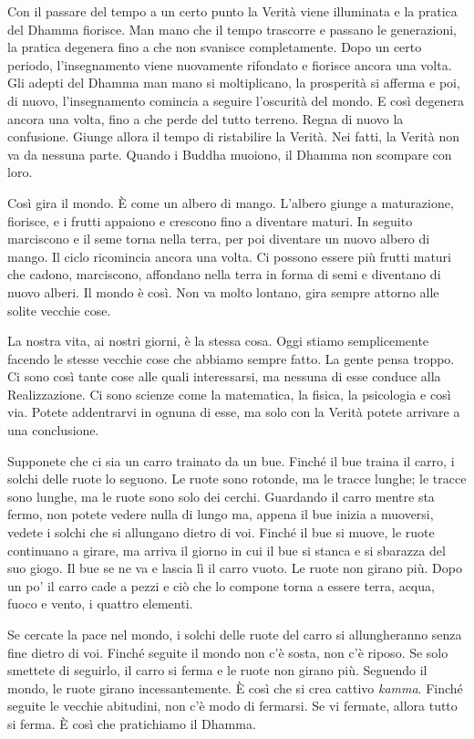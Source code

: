 Con il passare del tempo a un certo punto la Verità viene illuminata e
la pratica del Dhamma fiorisce. Man mano che il tempo trascorre e
passano le generazioni, la pratica degenera fino a che non svanisce
completamente. Dopo un certo periodo, l'insegnamento viene nuovamente
rifondato e fiorisce ancora una volta. Gli adepti del Dhamma man mano si
moltiplicano, la prosperità si afferma e poi, di nuovo, l'insegnamento
comincia a seguire l'oscurità del mondo. E così degenera ancora una
volta, fino a che perde del tutto terreno. Regna di nuovo la confusione.
Giunge allora il tempo di ristabilire la Verità. Nei fatti, la Verità
non va da nessuna parte. Quando i Buddha muoiono, il Dhamma non scompare
con loro.

Così gira il mondo. È come un albero di mango. L'albero giunge a
maturazione, fiorisce, e i frutti appaiono e crescono fino a diventare
maturi. In seguito marciscono e il seme torna nella terra, per poi
diventare un nuovo albero di mango. Il ciclo ricomincia ancora una
volta. Ci possono essere più frutti maturi che cadono, marciscono,
affondano nella terra in forma di semi e diventano di nuovo alberi. Il
mondo è così. Non va molto lontano, gira sempre attorno alle solite
vecchie cose.

La nostra vita, ai nostri giorni, è la stessa cosa. Oggi stiamo
semplicemente facendo le stesse vecchie cose che abbiamo sempre fatto.
La gente pensa troppo. Ci sono così tante cose alle quali interessarsi,
ma nessuna di esse conduce alla Realizzazione. Ci sono scienze come la
matematica, la fisica, la psicologia e così via. Potete addentrarvi in
ognuna di esse, ma solo con la Verità potete arrivare a una conclusione.

Supponete che ci sia un carro trainato da un bue. Finché il bue traina
il carro, i solchi delle ruote lo seguono. Le ruote sono rotonde, ma le
tracce lunghe; le tracce sono lunghe, ma le ruote sono solo dei cerchi.
Guardando il carro mentre sta fermo, non potete vedere nulla di lungo
ma, appena il bue inizia a muoversi, vedete i solchi che si allungano
dietro di voi. Finché il bue si muove, le ruote continuano a girare, ma
arriva il giorno in cui il bue si stanca e si sbarazza del suo giogo. Il
bue se ne va e lascia lì il carro vuoto. Le ruote non girano più. Dopo
un po' il carro cade a pezzi e ciò che lo compone torna a essere terra,
acqua, fuoco e vento, i quattro elementi.

Se cercate la pace nel mondo, i solchi delle ruote del carro si
allungheranno senza fine dietro di voi. Finché seguite il mondo non c'è
sosta, non c'è riposo. Se solo smettete di seguirlo, il carro si ferma e
le ruote non girano più. Seguendo il mondo, le ruote girano
incessantemente. È così che si crea cattivo \emph{kamma}. Finché seguite
le vecchie abitudini, non c'è modo di fermarsi. Se vi fermate, allora
tutto si ferma. È così che pratichiamo il Dhamma.

